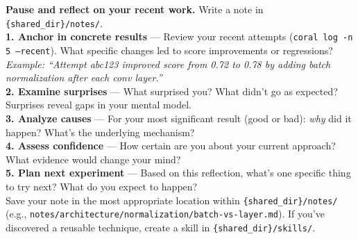 \begin{heartbeatbox}
\label{box:reflect}
\ttfamily\scriptsize
\textbf{Pause and reflect on your recent work.} Write a note in \texttt{\{shared\_dir\}/notes/}.\\[3pt]
\textbf{1. Anchor in concrete results} --- Review your recent attempts (\texttt{coral log -n 5 --recent}). What specific changes led to score improvements or regressions?\\[2pt]
\textit{Example: ``Attempt abc123 improved score from 0.72 to 0.78 by adding batch normalization after each conv layer.''}\\[3pt]
\textbf{2. Examine surprises} --- What surprised you? What didn't go as expected? Surprises reveal gaps in your mental model.\\[3pt]
\textbf{3. Analyze causes} --- For your most significant result (good or bad): \textit{why} did it happen? What's the underlying mechanism?\\[3pt]
\textbf{4. Assess confidence} --- How certain are you about your current approach? What evidence would change your mind?\\[3pt]
\textbf{5. Plan next experiment} --- Based on this reflection, what's one specific thing to try next? What do you expect to happen?\\[3pt]
Save your note in the most appropriate location within \texttt{\{shared\_dir\}/notes/} (e.g., \texttt{notes/architecture/normalization/batch-vs-layer.md}). If you've discovered a reusable technique, create a skill in \texttt{\{shared\_dir\}/skills/}.
\end{heartbeatbox}

